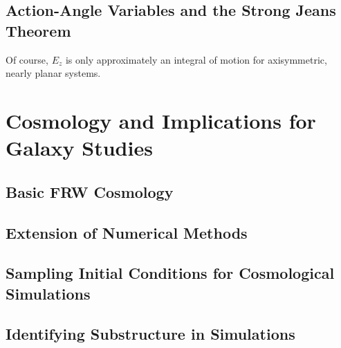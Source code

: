 \subsection{Action-Angle Variables and the Strong Jeans Theorem}

Of course, $E_z$ is only approximately an integral of motion for axisymmetric, nearly planar systems.


\section{Cosmology and Implications for Galaxy Studies} \label{sec:cosmology}
\subsection{Basic FRW Cosmology}
\subsection{Extension of Numerical Methods}
\subsection{Sampling Initial Conditions for Cosmological Simulations}
\subsection{Identifying Substructure in Simulations}






